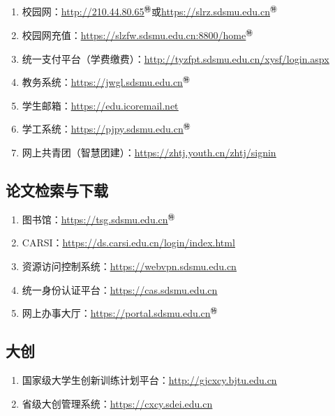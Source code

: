 \subsection[日常使用]{\textbf{}}
\begin{enumerate}
    \item 校园网：\uline{\href{http://210.44.80.65}{http://210.44.80.65}$^㊕$}或\uline{\href{https://slrz.sdsmu.edu.cn}{https://slrz.sdsmu.edu.cn}$^㊕$}
    \item 校园网充值：\uline{\href{https://slzfw.sdsmu.edu.cn:8800/home}{https://slzfw.sdsmu.edu.cn:8800/home}$^㊕$}
    \item 统一支付平台（学费缴费）：\uline{\href{http://tyzfpt.sdsmu.edu.cn/xysf/login.aspx}{http://tyzfpt.sdsmu.edu.cn/xysf/login.aspx}}
    \item 教务系统：\uline{\href{https://jwgl.sdsmu.edu.cn}{https://jwgl.sdsmu.edu.cn}$^㊕$}
    \item 学生邮箱：\uline{\href{https://edu.icoremail.net}{https://edu.icoremail.net}}
    \item 学工系统：\uline{\href{https://pjpy.sdsmu.edu.cn}{https://pjpy.sdsmu.edu.cn}$^㊕$}
    \item 网上共青团（智慧团建）：\uline{\href{https://zhtj.youth.cn/zhtj/signin}{https://zhtj.youth.cn/zhtj/signin}}
\end{enumerate}

\subsection[论文检索与下载]{论文检索与下载}
\begin{enumerate}
    \item 图书馆：\uline{\href{https://tsg.sdsmu.edu.cn}{https://tsg.sdsmu.edu.cn}$^㊕$}
    \item CARSI：\uline{\href{https://ds.carsi.edu.cn/login/index.html}{https://ds.carsi.edu.cn/login/index.html}}
    \item 资源访问控制系统：\uline{\href{https://webvpn.sdsmu.edu.cn}{https://webvpn.sdsmu.edu.cn}}
    \item 统一身份认证平台：\uline{\href{https://cas.sdsmu.edu.cn}{https://cas.sdsmu.edu.cn}}
    \item 网上办事大厅：\uline{\href{https://portal.sdsmu.edu.cn}{https://portal.sdsmu.edu.cn}$^㊕$}
\end{enumerate}

\subsection[大创]{大创\footnotemark}
\begin{enumerate}
    \item 国家级大学生创新训练计划平台：\uline{\href{http://gjcxcy.bjtu.edu.cn}{http://gjcxcy.bjtu.edu.cn}}
    \item 省级大创管理系统：\uline{\href{https://cxcy.sdei.edu.cn}{https://cxcy.sdei.edu.cn}}
\end{enumerate}

